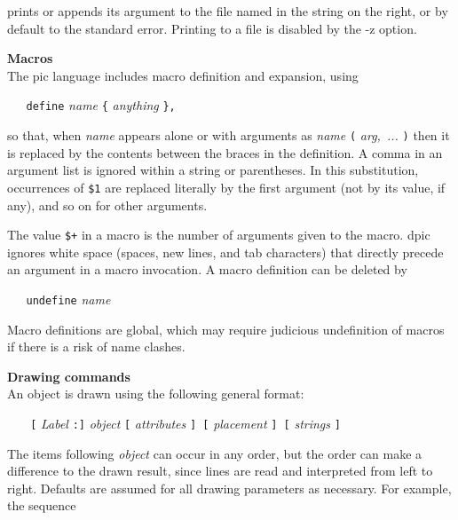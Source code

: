 prints or appends its argument to the file named in the string
on the right, or by default to the standard error.
Printing to a file is disabled by the -z option.

\par\hskip-2pc{\bf Macros}\\
The
pic
language includes macro definition and expansion, using

{\tt \ \ \ define}
{\it name}
{\tt \{}
{\it anything}
{\tt \},}

so that, when
{\it name}
appears alone or with arguments as
{\it name}
{\tt (}
{\it arg,\ ...}
{\tt )}
then it is replaced by the contents between the braces in the definition.
A comma in an argument list is ignored within a string or parentheses.
In this substitution, occurrences of
{\tt \$1}
are replaced literally by the first argument (not by its value, if any),
and so on for other arguments.

The value
{\tt \$+}
in a macro is the number of arguments given to the macro.
dpic
ignores white space (spaces, new lines, and tab characters) that directly
precede an argument in a macro invocation.
A macro definition can be deleted by

{\tt \ \ \ undefine}
{\it name}

Macro definitions are global, which may require judicious
undefinition of macros if there is a risk of name clashes.
\par\hskip-2pc{\bf Drawing commands}\\
An object is drawn using the following general format:

{\it \ \ \ }
{\tt [}
{\it Label}
{\tt :]}
{\it object}
{\tt [}
{\it attributes}
{\tt ]\ [}
{\it placement}
{\tt ]\ [}
{\it strings}
{\tt ]}

The items following
{\it object}
can occur in any order, but the order can make a difference to the
drawn result, since lines are read and interpreted from left to right.
Defaults are assumed for all drawing parameters as necessary.
For example, the sequence

